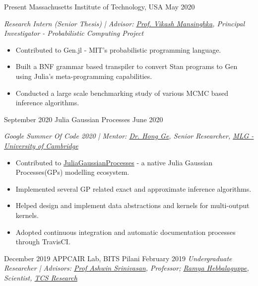 %
%
%
\begin{experiences}
\researchexperience
    {Present}   {Massachusetts Institute of Technology, USA}{}{}
    {May 2020} {\textit{Research Intern (Senior Thesis) | Advisor:  \href{http://probcomp.csail.mit.edu/principal-investigator/}{Prof. Vikash Mansinghka}, Principal Investigator - Probabilistic Computing Project}
    \begin{itemize}
        \item Contributed to Gen.jl - MIT's probabilistic programming language.
        \item Built a BNF grammar based transpiler to convert Stan programs to Gen using Julia's meta-programming capabilities.
        \item Conducted a large scale benchmarking study of various MCMC based inference algorithms.
    \end{itemize}}
  \emptySeparator
 \researchexperience
    {September 2020}   {Julia Gaussian Processes}{}{}
    {June 2020} {\textit{Google Summer Of Code 2020 | Mentor: \href{http://mlg.eng.cam.ac.uk/hong/}{Dr. Hong Ge}, Senior Researcher, \href{http://mlg.eng.cam.ac.uk/}{MLG - University of Cambridge}}
    \begin{itemize}
        \item Contributed to \href{https://github.com/JuliaGaussianProcesses/}{JuliaGaussianProcesses} - a native Julia Gaussian Processes(GPs) modelling ecosystem.
        \item Implemented several GP related exact and approximate inference algorithms.
        \item Helped design and implement data abstractions and kernels for multi-output kernels.
        \item Adopted continuous integration and automatic documentation processes through TravisCI.
    \end{itemize}        
    }
  \emptySeparator
    \researchexperience
    {December 2019}   {APPCAIR Lab, BITS Pilani}{}{}
    {February 2019} {\textit{Undergraduate Researcher | Advisors: \href{https://scholar.google.com.au/citations?user=zpNTeogAAAAJ}{Prof Ashwin Srinivasan}, Professor; \href{https://scholar.google.co.in/citations?user=IJjnjZIAAAAJ}{Ramya Hebbalaguppe}, Scientist, \href{https://www.tcs.com/tcs-research}{TCS Research}}\\
}
\end{experiences}
